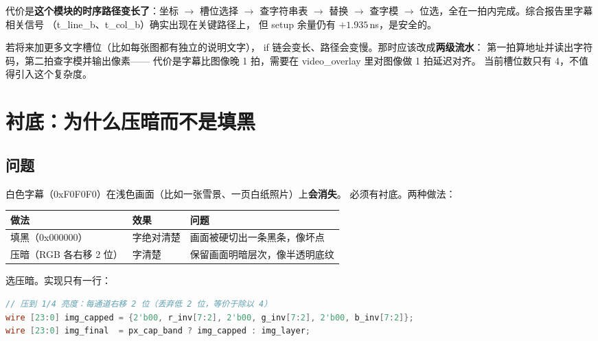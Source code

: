 \documentclass[10pt,a4paper]{article}
\newcommand{\sig}[1]{{\ttfamily\small #1}}
\newcommand{\code}[1]{{\ttfamily\small #1}}
\begin{document}
代价是\textbf{这个模块的时序路径变长了}：坐标 $\to$ 槽位选择 $\to$ 查字符串表 $\to$ 替换
$\to$ 查字模 $\to$ 位选，全在一拍内完成。综合报告里字幕相关信号
（\code{t\_line\_b}、\code{t\_col\_b}）确实出现在关键路径上，
但 setup 余量仍有 $+1.935$\,ns，是安全的。

\begin{dsnote}[什么时候该放弃单路]
若将来加更多文字槽位（比如每张图都有独立的说明文字），
\code{if} 链会变长、路径会变慢。那时应该改成\textbf{两级流水}：
第一拍算地址并读出字符码，第二拍查字模并输出像素——
代价是字幕比图像晚 1 拍，需要在 \sig{video\_overlay} 里对图像做 1 拍延迟对齐。
当前槽位数只有 4，不值得引入这个复杂度。
\end{dsnote}

\section{衬底：为什么压暗而不是填黑}
\label{sec:band}

\subsection{问题}

白色字幕（\code{0xF0F0F0}）在浅色画面（比如一张雪景、一页白纸照片）上\textbf{会消失}。
必须有衬底。两种做法：

\begin{center}\small
\begin{tabular}{@{}l l l@{}}
\toprule
\textbf{做法} & \textbf{效果} & \textbf{问题}\\
\midrule
填黑（\code{0x000000}） & 字绝对清楚 & 画面被硬切出一条黑条，像坏点\\
压暗（RGB 各右移 2 位） & 字清楚 & 保留画面明暗层次，像半透明底纹\\
\bottomrule
\end{tabular}
\end{center}

选压暗。实现只有一行：

\begin{lstlisting}[language=Verilog,caption={衬底压暗（\sig{video\_overlay.v}）},label={lst:band}]
// 压到 1/4 亮度：每通道右移 2 位（丢弃低 2 位，等价于除以 4）
wire [23:0] img_capped = {2'b00, r_inv[7:2], 2'b00, g_inv[7:2], 2'b00, b_inv[7:2]};
wire [23:0] img_final  = px_cap_band ? img_capped : img_layer;
\end{lstlisting}
\end{document}
